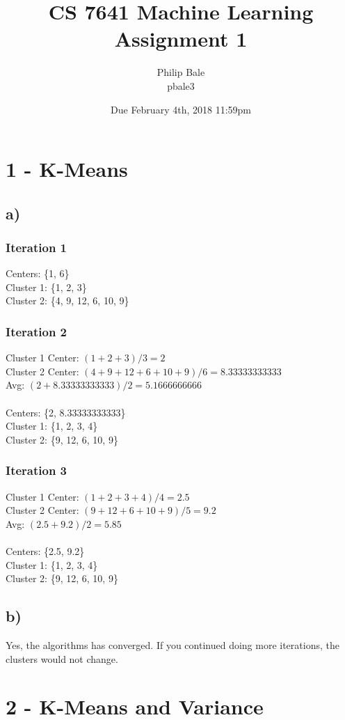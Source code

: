 \documentclass[h]{article}
\title{CS 7641 Machine Learning \\ Assignment 1}
\date{Due February 4th, 2018 11:59pm}
\author{Philip Bale \\ pbale3}
\begin{document}
\maketitle

\section*{1 - K-Means}
\subsection*{a)}  
\subsubsection*{Iteration 1}
Centers: \{1, 6\} \\
Cluster 1: \{1, 2, 3\} \\
Cluster 2: \{4, 9, 12, 6, 10, 9\}
\subsubsection*{Iteration 2}
Cluster 1 Center: $(1 + 2 + 3) / 3 = 2$ \\
Cluster 2 Center: $(4 + 9 + 12 + 6 + 10 + 9) / 6 = 8.33333333333$ \\ 
Avg: $(2 + 8.33333333333) / 2 = 5.1666666666$\\ \\
Centers: \{2, 8.33333333333\} \\
Cluster 1: \{1, 2, 3, 4\} \\
Cluster 2: \{9, 12, 6, 10, 9\}
\subsubsection*{Iteration 3}
Cluster 1 Center: $(1 + 2 + 3 + 4) / 4 = 2.5$ \\
Cluster 2 Center: $( 9 + 12 + 6 + 10 + 9) / 5 = 9.2$ \\ 
Avg: $(2.5 + 9.2) / 2 = 5.85$\\ \\
Centers: \{2.5, 9.2\} \\
Cluster 1: \{1, 2, 3, 4\} \\
Cluster 2: \{9, 12, 6, 10, 9\}
\subsection*{b)} 
Yes, the algorithms has converged.  If you continued doing more iterations, the clusters would not change.

\section*{2 - K-Means and Variance}
\end{document}
